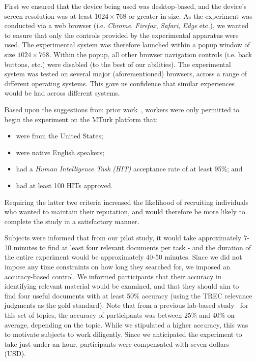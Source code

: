 First we ensured that the device being used was desktop-based, and the device's screen resolution was at least $1024 \times 768$ or greater in size. As the experiment was conducted via a web browser (i.e. \emph{Chrome}, \emph{Firefox}, \emph{Safari}, \emph{Edge} etc.), we wanted to ensure that only the controls provided by the experimental apparatus were used. The experimental system was therefore launched within a popup window of size $1024 \times 768$. Within the popup, all other browser navigation controls (i.e. back buttons, etc.) were disabled (to the best of our abilities). The experimental system was tested on several major (aforementioned) browsers, across a range of different operating systems. This gave us confidence that similar experiences would be had across different systems.

Based upon the suggestions from prior work~\cite{feild2010turkers,zuccon2013crowdsourcing}, workers were only permitted to begin the experiment on the MTurk platform that:

\begin{itemize}
\item were from the United States;
\item were native English speakers;
\item had a \emph{Human Intelligence Task (HIT)} acceptance rate of at least 95\%; and 
\item had at least 100 HITs approved.
\end{itemize}

Requiring the latter two criteria increased the likelihood of recruiting individuals who wanted to maintain their reputation, and would therefore be more likely to complete the study in a satisfactory manner. 

Subjects were informed that from our pilot study, it would take approximately 7-10 minutes to find at least four relevant documents per task - and the duration of the entire experiment would be approximately 40-50 minutes. Since we did not impose any time constraints on how long they searched for, we imposed an accuracy-based control. We informed participants that their accuracy in identifying relevant material would be examined, and that they should aim to find four useful documents with at least 50\% accuracy (using the TREC relevance judgments as the gold standard). Note that from a previous lab-based study~\cite{maxwell2017snippet_length} for this set of topics, the accuracy of participants was between 25\% and 40\% on average, depending on the topic. While we stipulated a higher accuracy, this was to motivate subjects to work diligently. Since we anticipated the experiment to take just under an hour, participants were compensated with seven dollars (USD).

